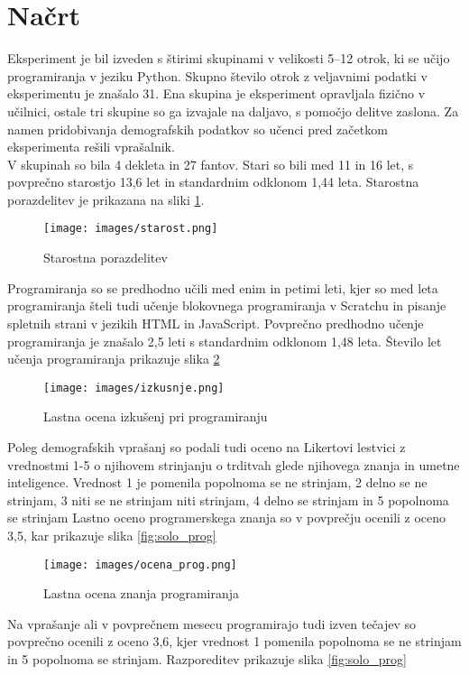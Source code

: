 \documentclass[a4paper,12pt,openright]{book}
\begin{document}
\section{Načrt}
Eksperiment je bil izveden s štirimi skupinami v velikosti 5–12 otrok, ki se učijo programiranja v jeziku Python. Skupno število otrok z veljavnimi podatki v eksperimentu je znašalo 31. Ena skupina je eksperiment opravljala fizično v učilnici, ostale tri skupine so ga izvajale na daljavo, s pomočjo delitve zaslona. Za namen pridobivanja demografskih podatkov so učenci pred začetkom eksperimenta rešili vprašalnik.\\
V skupinah so bila 4 dekleta in 27 fantov. Stari so bili med 11 in 16 let, s povprečno starostjo 13,6 let in standardnim odklonom 1,44 leta. Starostna porazdelitev je prikazana na sliki \ref{fig:ages}. \\
\begin{figure}[H]
    \centering
    \texttt{[image: images/starost.png]}
    \caption{Starostna porazdelitev}
    \label{fig:ages}
\end{figure}
Programiranja so se predhodno učili med enim in petimi leti, kjer so med leta programiranja šteli tudi učenje blokovnega programiranja v Scratchu in pisanje spletnih strani v jezikih HTML in JavaScript. Povprečno predhodno učenje programiranja je znašalo 2,5 leti s standardnim odklonom 1,48 leta. Število let učenja programiranja prikazuje slika \ref{fig:izkusnje} \\
\begin{figure}[H]
    \centering
    \texttt{[image: images/izkusnje.png]}
    \caption{Lastna ocena izkušenj pri programiranju}
    \label{fig:izkusnje}
\end{figure}
Poleg demografskih vprašanj so podali tudi oceno na Likertovi lestvici z vrednostmi 1-5 o njihovem strinjanju o trditvah glede njihovega znanja in umetne inteligence. Vrednost 1 je pomenila popolnoma se ne strinjam, 2 delno se ne strinjam, 3 niti se ne strinjam niti strinjam, 4 delno se strinjam in 5 popolnoma se strinjam  Lastno oceno programerskega znanja so v povprečju ocenili z oceno 3,5, kar prikazuje slika \ref{fig:solo_prog} \\
\begin{figure}[H]
    \centering
    \texttt{[image: images/ocena\_prog.png]}
    \caption{Lastna ocena znanja programiranja}
    \label{fig:ocena_prog}
\end{figure}
Na vprašanje ali v povprečnem mesecu programirajo tudi izven tečajev so povprečno ocenili z oceno 3,6, kjer vrednost 1 pomenila popolnoma se ne strinjam in 5 popolnoma se strinjam. Razporeditev prikazuje slika \ref{fig:solo_prog} \\
\end{document}
